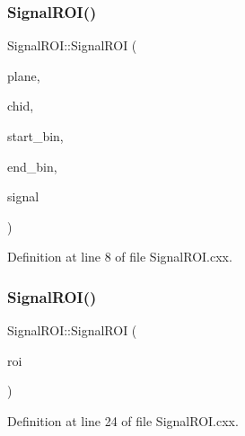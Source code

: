 \subsubsection{\texorpdfstring{Signal\+R\+O\+I()}{SignalROI()}\hspace{0.1cm}{\footnotesize\ttfamily [1/2]}}
{\footnotesize\ttfamily Signal\+R\+O\+I\+::\+Signal\+R\+OI (\begin{DoxyParamCaption}\item[{int}]{plane,  }\item[{int}]{chid,  }\item[{int}]{start\+\_\+bin,  }\item[{int}]{end\+\_\+bin,  }\item[{const \hyperlink{namespace_wire_cell_1_1_waveform_a479175e541c8545e87cd8063b74b6956}{Waveform\+::realseq\+\_\+t} \&}]{signal }\end{DoxyParamCaption})}



Definition at line 8 of file Signal\+R\+O\+I.\+cxx.

\mbox{\label{class_wire_cell_1_1_sig_proc_1_1_signal_r_o_i_a19b3f1c69aa59c14e928af82302de058}} 
\subsubsection{\texorpdfstring{Signal\+R\+O\+I()}{SignalROI()}\hspace{0.1cm}{\footnotesize\ttfamily [2/2]}}
{\footnotesize\ttfamily Signal\+R\+O\+I\+::\+Signal\+R\+OI (\begin{DoxyParamCaption}\item[{\hyperlink{class_wire_cell_1_1_sig_proc_1_1_signal_r_o_i}{Signal\+R\+OI} $\ast$}]{roi }\end{DoxyParamCaption})}



Definition at line 24 of file Signal\+R\+O\+I.\+cxx.

